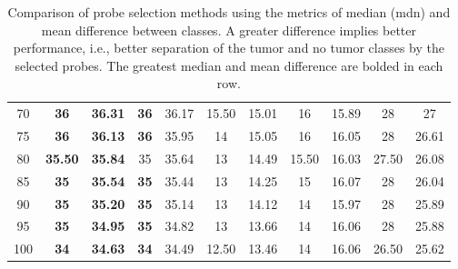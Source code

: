 \documentclass[12pt]{article}
\begin{document}
\begin{table}[h]
{\begin{tabular}{|c|cc|cc|cc|cc|cc|}
70 & \textbf{36} & \textbf{36.31} & \textbf{36} & 36.17 & 15.50 & 15.01 & 16 & 15.89 & 28 & 27 \\
75 & \textbf{36} & \textbf{36.13} & \textbf{36} & 35.95 & 14 & 15.05 & 16 & 16.05 & 28 & 26.61 \\
80 & \textbf{35.50} & \textbf{35.84} & 35 & 35.64 & 13 & 14.49 & 15.50 & 16.03 & 27.50 & 26.08 \\
85 & \textbf{35} & \textbf{35.54} & \textbf{35} & 35.44 & 13 & 14.25 & 15 & 16.07 & 28 & 26.04 \\
90 & \textbf{35} & \textbf{35.20} & \textbf{35} & 35.14 & 13 & 14.12 & 14 & 15.97 & 28 & 25.89 \\
95 & \textbf{35} & \textbf{34.95} & \textbf{35} & 34.82 & 13 & 13.66 & 14 & 16.06 & 28 & 25.88 \\
100 & \textbf{34} & \textbf{34.63} & \textbf{34} & 34.49 & 12.50 & 13.46 & 14 & 16.06 & 26.50 & 25.62 \\
        \hline
    \end{tabular}}
    \caption{Comparison of probe selection methods using the metrics of median (mdn) and mean difference between classes.  A greater difference implies better performance, i.e., better separation of the tumor and no tumor classes by the selected probes. The greatest median and mean difference are bolded in each row.}
    \label{tab:ps}
\end{table}
\end{document}
